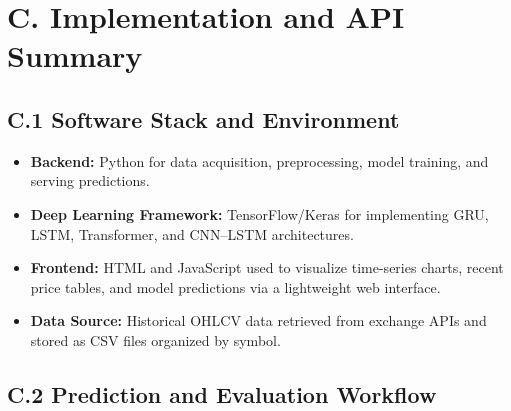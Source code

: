 \newpage

\section*{C. Implementation and API Summary}

\subsection*{C.1 Software Stack and Environment}

\begin{itemize}
    \item \textbf{Backend:} Python for data acquisition, preprocessing, model training, and serving predictions.
    \item \textbf{Deep Learning Framework:} TensorFlow/Keras for implementing GRU, LSTM, Transformer, and CNN--LSTM architectures.
    \item \textbf{Frontend:} HTML and JavaScript used to visualize time-series charts, recent price tables, and model predictions via a lightweight web interface.
    \item \textbf{Data Source:} Historical OHLCV data retrieved from exchange APIs and stored as CSV files organized by symbol.
\end{itemize}

\subsection*{C.2 Prediction and Evaluation Workflow}

